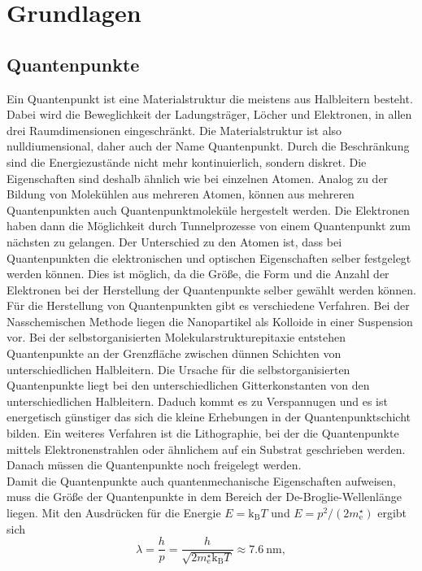 \section{Grundlagen}\label{sec:Grundlagen}
\subsection{Quantenpunkte}
Ein Quantenpunkt ist eine Materialstruktur die meistens aus Halbleitern besteht. Dabei wird die Beweglichkeit der Ladungsträger, Löcher und Elektronen, in allen drei Raumdimensionen eingeschränkt. Die Materialstruktur ist also nulldiumensional, daher auch der Name Quantenpunkt.  Durch die Beschränkung sind die Energiezustände nicht mehr kontinuierlich, sondern diskret. Die Eigenschaften sind deshalb ähnlich wie bei einzelnen Atomen. Analog zu der Bildung von Molekühlen aus mehreren Atomen, können aus mehreren Quantenpunkten auch  Quantenpunktmoleküle hergestelt werden. Die Elektronen haben dann die Möglichkeit durch Tunnelprozesse von einem Quantenpunkt zum nächsten zu gelangen. Der Unterschied zu den Atomen ist, dass bei Quantenpunkten die elektronischen und optischen Eigenschaften selber festgelegt werden können. Dies ist möglich, da die Größe, die Form und die Anzahl der Elektronen bei der Herstellung der Quantenpunkte selber gewählt werden können. \\
Für die Herstellung von Quantenpunkten gibt es verschiedene Verfahren. Bei der Nasschemischen Methode liegen die Nanopartikel als Kolloide in einer Suspension vor. Bei der selbstorganisierten Molekularstrukturepitaxie entstehen Quantenpunkte an der Grenzfläche zwischen dünnen Schichten von unterschiedlichen Halbleitern. Die Ursache für die selbstorganisierten Quantenpunkte liegt bei den unterschiedlichen Gitterkonstanten von den unterschiedlichen Halbleitern. Daduch kommt es zu Verspannugen und es ist energetisch günstiger das sich die  kleine Erhebungen in der Quantenpunktschicht bilden. Ein weiteres Verfahren ist die Lithographie, bei der die Quantenpunkte mittels Elektronenstrahlen oder ähnlichem auf ein Substrat   \glqq geschrieben\grqq{} werden. Danach müssen die Quantenpunkte noch \glqq freigelegt\grqq{} werden. \\
Damit die Quantenpunkte auch quantenmechanische Eigenschaften aufweisen, muss die Größe der Quantenpunkte in dem Bereich der De-Broglie-Wellenlänge liegen.  Mit den Ausdrücken für die Energie $ E = \mathrm{k}_{\mathrm{B}} T$ und $ E = p^2/(2m_{\mathrm{e}}^\star)$ ergibt sich
\begin{equation}
\lambda = \frac{h}{p} = \frac{h}{\sqrt{2m_{\mathrm{e}}^\star \mathrm{k}_{\mathrm{B}} T}} \approx 7.6\ \mathrm{nm},
\end{equation}
